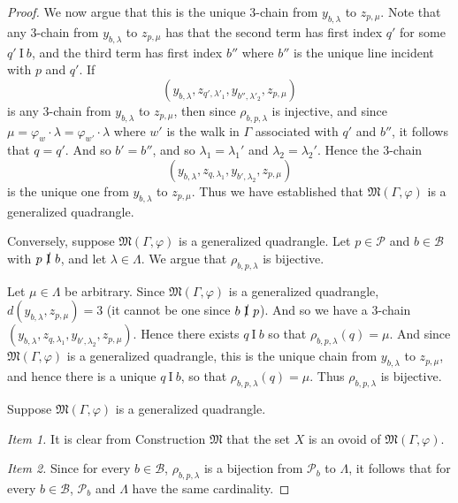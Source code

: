 \documentclass[11pt]{article}
\theoremstyle{definition}
\begin{document}
\begin{proof}
We now argue that this is the unique $3$-chain from $y_{b,\lambda}$ to $z_{p,\mu}$.  Note that any $3$-chain from $y_{b,\lambda}$ to $z_{p,\mu}$ has that the second term has first index $q'$ for some $q' \  \mathrm{I} \  b$, and the third term has first index $b''$ where $b''$ is the unique line incident with $p$ and $q'$.  If $$(y_{b,\lambda}, z_{q',\lambda'_1}, y_{b'',\lambda'_2}, z_{p,\mu})$$ 
is any $3$-chain from $y_{b,\lambda}$ to $z_{p,\mu}$, then since $\rho_{b,p,\lambda}$ is injective, and since $\mu = \varphi_w \cdot \lambda = \varphi_{w'} \cdot \lambda$ where $w'$ is the walk in $\Gamma$ associated with $q'$ and $b''$, it follows that $q = q'$.  And so $b' = b''$, and so $\lambda_1 = \lambda_1'$ and $\lambda_2 = \lambda_2'$.  Hence the $3$-chain  $$(y_{b,\lambda}, z_{q,\lambda_1}, y_{b',\lambda_2}, z_{p,\mu})$$
is the unique one from $y_{b,\lambda}$ to $z_{p,\mu}$.  Thus we have established that $\mathfrak{M}(\Gamma,\varphi)$ is a generalized quadrangle.

Conversely, suppose $\mathfrak{M}(\Gamma,\varphi)$ is a generalized quadrangle.  Let $p \in \mathscr{P}$ and $b \in \mathscr{B}$ with $p \  \cancel{\mathrm{I}} \  b$, and let $\lambda \in \Lambda$.  We argue that $\rho_{b,p,\lambda}$ is bijective.  

Let $\mu \in \Lambda$ be arbitrary.  Since $\mathfrak{M}(\Gamma,\varphi)$ is a generalized quadrangle, $d(y_{b,\lambda},z_{p,\mu}) = 3$ (it cannot be one since $b \  \cancel{\mathrm{I}} \  p$).  And so we have a $3$-chain $(y_{b,\lambda},z_{q,\lambda_1},y_{b',\lambda_2},z_{p,\mu})$.  Hence there exists $q \ \mathrm{I} \ b$ so that $\rho_{b,p,\lambda}(q) = \mu$.  And since $\mathfrak{M}(\Gamma,\varphi)$ is a generalized quadrangle, this is the unique chain from $y_{b,\lambda}$ to $z_{p,\mu}$, and hence there is a unique $q \ \mathrm{I} \ b$, so that $\rho_{b,p,\lambda}(q) = \mu$.  Thus $\rho_{b,p,\lambda}$ is bijective.
 
Suppose $\mathfrak{M}(\Gamma,\varphi)$ is a generalized quadrangle.

\textit{Item 1.}  It is clear from Construction $\mathfrak{M}$ that the set $X$ is an ovoid of $\mathfrak{M}(\Gamma,\varphi)$.

\textit{Item 2.}  Since for every $b \in \mathscr{B}$, $\rho_{b,p,\lambda}$ is a bijection from $\mathscr{P}_b$ to $\Lambda$, it follows that for every $b \in \mathscr{B}$, $\mathscr{P}_b$ and $\Lambda$ have the same cardinality.


\end{proof}
\end{document}
